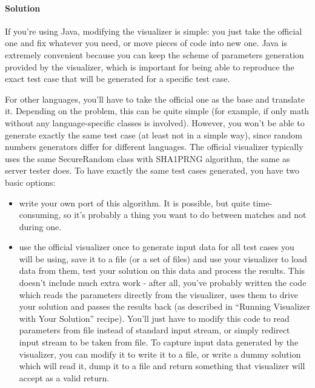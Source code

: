 \documentclass[]{article}
\let\oldparagraph\paragraph
\renewcommand{\paragraph}[1]{\oldparagraph{#1}\mbox{}}
\begin{document}
\hypertarget{solution-2}{%
\paragraph{Solution}\label{solution-2}}

If you're using Java, modifying the visualizer is simple: you just take
the official one and fix whatever you need, or move pieces of code into
new one. Java is extremely convenient because you can keep the scheme of
parameters generation provided by the visualizer, which is important for
being able to reproduce the exact test case that will be generated for a
specific test case.

For other languages, you'll have to take the official one as the base
and translate it. Depending on the problem, this can be quite simple
(for example, if only math without any language-specific classes is
involved). However, you won't be able to generate exactly the same test
case (at least not in a simple way), since random numbers generators
differ for different languages. The official visualizer typically uses
the same SecureRandom class with SHA1PRNG algorithm, the same as server
tester does. To have exactly the same test cases generated, you have two
basic options:

\begin{itemize}
\item
  write your own port of this algorithm. It is possible, but quite
  time-consuming, so it's probably a thing you want to do between
  matches and not during one.
\item
  use the official visualizer once to generate input data for all test
  cases you will be using, save it to a file (or a set of files) and use
  your visualizer to load data from them, test your solution on this
  data and process the results. This doesn't include much extra work -
  after all, you've probably written the code which reads the parameters
  directly from the visualizer, uses them to drive your solution and
  passes the results back (as described in ``Running Visualizer with
  Your Solution'' recipe). You'll just have to modify this code to read
  parameters from file instead of standard input stream, or simply
  redirect input stream to be taken from file. To capture input data
  generated by the visualizer, you can modify it to write it to a file,
  or write a dummy solution which will read it, dump it to a file and
  return something that visualizer will accept as a valid return.
\end{itemize}
\end{document}
